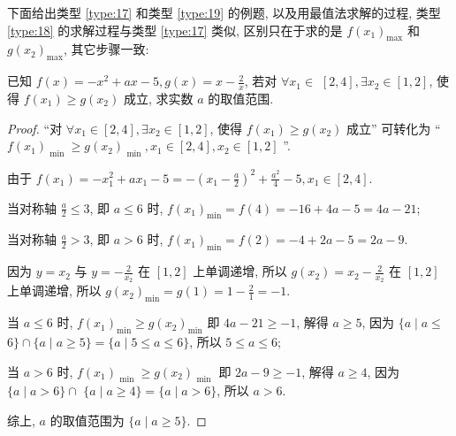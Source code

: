 下面给出类型 \ref{type:17} 和类型 \ref{type:19} 的例题, 以及用最值法求解的过程, 类型 \ref{type:18} 的求解过程与类型 \ref{type:17} 类似, 区别只在于求的是 \(f{\left( {x}_{1}\right) }_{\max }\) 和 \(g{\left( {x}_{2}\right) }_{\max }\), 其它步骤一致:

\begin{variation}\label{variation:2.1.10}
  已知 \(f(x)  =  -{x}^{2} + {ax} -5, g(x)  = x -\frac{2}{x}\), 若对 \(\forall {x}_{1} \in\)  \(\left\lbrack  {2, 4}\right\rbrack  , \exists {x}_{2} \in  \left\lbrack  {1, 2}\right\rbrack\), 使得 \(f\left( {x}_{1}\right)  \geq  g\left( {x}_{2}\right)\) 成立, 求实数 \(a\) 的取值范围.
\end{variation}


\begin{proof}
  “对 \(\forall {x}_{1} \in  \left\lbrack  {2, 4}\right\rbrack  , \exists {x}_{2} \in  \left\lbrack  {1, 2}\right\rbrack\), 使得 \(f\left( {x}_{1}\right)  \geq  g\left( {x}_{2}\right)\) 成立” 可转化为 “ \(f{\left( {x}_{1}\right) }_{\text{ min }} \geq  g{\left( {x}_{2}\right) }_{\text{ min }}, {x}_{1} \in  \left\lbrack  {2, 4}\right\rbrack  , {x}_{2} \in  \left\lbrack  {1, 2}\right\rbrack\) ”.

由于 \(f\left( {x}_{1}\right)  =  -{x}_{1}^{2} + a{x}_{1} -5 =  -{\left( {x}_{1} -\frac{a}{2}\right) }^{2} + \frac{{a}^{2}}{4} -5, {x}_{1} \in  \left\lbrack  {2, 4}\right\rbrack\).

当对称轴 \(\frac{a}{2} \leq  3\), 即 \(a \leq  6\) 时, \(f{\left( {x}_{1}\right) }_{\min } = f\left( 4\right)  =  -{16} + {4a} -5 = {4a} -{21}\);

当对称轴 \(\frac{a}{2} > 3\), 即 \(a > 6\) 时, \(f{\left( {x}_{1}\right) }_{\min } = f\left( 2\right)  =  -4 + {2a} -5 = {2a} -9\).

因为 \(y = {x}_{2}\) 与 \(y =  -\frac{2}{{x}_{2}}\) 在 \(\left\lbrack  {1, 2}\right\rbrack\) 上单调递增, 所以 \(g\left( {x}_{2}\right)  = {x}_{2} -\frac{2}{{x}_{2}}\) 在 \(\left\lbrack  {1, 2}\right\rbrack\) 上单调递增, 所以 \(g{\left( {x}_{2}\right) }_{\min } = g\left( 1\right)  = 1 -\frac{2}{1} =  -1\).

当 \(a \leq  6\) 时, \(f{\left( {x}_{1}\right) }_{\min } \geq  g{\left( {x}_{2}\right) }_{\min }\) 即 \({4a} -{21} \geq   -1\), 解得 \(a \geq  5\), 因为 \(\{ a \mid  a \leq\)  \(6\}  \cap  \{ a \mid  a \geq  5\}  = \{ a \mid  5 \leq  a \leq  6\}\), 所以 \(5 \leq  a \leq  6\);

当 \(a > 6\) 时, \(f{\left( {x}_{1}\right) }_{\text{ min }} \geq  g{\left( {x}_{2}\right) }_{\text{ min }}\) 即 \({2a} -9 \geq   -1\), 解得 \(a \geq  4\), 因为 \(\{ a \mid  a > 6\}  \cap\)  \(\{ a \mid  a \geq  4\}  = \{ a \mid  a > 6\}\), 所以 \(a > 6\).

综上, \(a\) 的取值范围为 \(\{ a \mid  a \geq  5\}\).
\end{proof}

